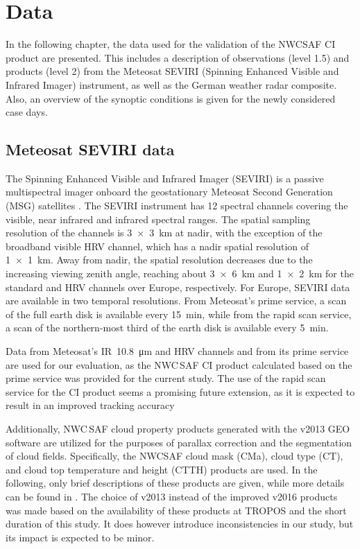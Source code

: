 \chapter{Data}
In the following chapter, the data used for the validation of the NWCSAF CI product are presented. This includes a description of observations (level 1.5) and products (level 2) from the Meteosat SEVIRI (Spinning Enhanced Visible and Infrared Imager) instrument, as well as the German weather radar composite. Also, an overview of the synoptic conditions is given for the newly considered case days.

\section{Meteosat SEVIRI data}
The Spinning Enhanced Visible and Infrared Imager (SEVIRI) is a passive multispectral imager onboard the geostationary Meteosat Second Generation (MSG) satellites \citep{Schmetz2002}. The SEVIRI instrument has 12 spectral channels covering the visible, near infrared and infrared spectral ranges. The spatial sampling resolution of the channels is \SI{3x3}{\kilo\metre} at nadir, with the exception of the broadband visible HRV channel, which has a nadir spatial resolution of \SI{1x1}{\kilo\metre}. Away from nadir, the spatial resolution decreases due to the increasing viewing zenith angle, reaching about \SI{3x6}{\kilo\metre} and \SI{1x2}{\kilo\metre} for the standard and HRV channels over Europe, respectively. For Europe, SEVIRI data are available in two temporal resolutions. From Meteosat's prime service, a scan of the full earth disk is available every \SI{15}{\minute}, while from the rapid scan service, a scan of the northern-most third of the earth disk is available every \SI{5}{\minute}.

Data from Meteosat's IR~\SI{10.8}{\micro\metre} and HRV channels and from its prime service are used for our evaluation, as the NWC\,SAF CI product calculated based on the prime service was provided for the current study. The use of the rapid scan service for the CI product seems a promising future extension, as it is expected to result in an improved tracking accuracy 

Additionally, NWC\,SAF cloud property products generated with the v2013 GEO software are utilized for the purposes of parallax correction and the segmentation of cloud fields. Specifically, the NWCSAF  cloud mask (CMa), cloud type (CT), and cloud top temperature and height (CTTH) products are used. In the following, only brief descriptions of these products are given, while more details can be found in \citet{NWCSAFWolken2014}. The choice of v2013 instead of the improved v2016 products was made based on the availability of these products at TROPOS and the short duration of this study. It does however introduce inconsistencies in our study, but its impact is expected to be minor.

